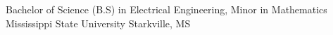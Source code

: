 

\begin{cventries}

  \cventry
    {Bachelor of Science (B.S) in Electrical Engineering, Minor in Mathematics} %
    {Mississippi State University} %
    {Starkville, MS} %
    {} %
    {}
    {}

\end{cventries}
